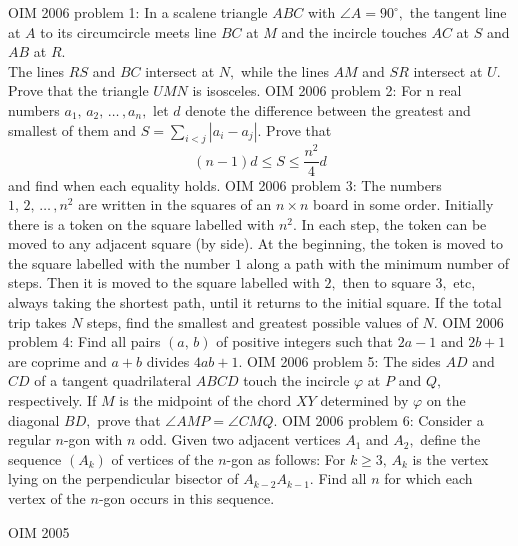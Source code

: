 OIM 2006 problem 1:  In a scalene triangle $ABC$ with $\angle A = 90^\circ,$ the tangent line at $A$ to its circumcircle meets line $BC$ at $M$ and the incircle touches $AC$ at $S$ and $AB$ at $R.$ \\
The lines $RS$ and $BC$ intersect at $N,$ while the lines $AM$ and $SR$ intersect at $U.$ \\
Prove that the triangle $UMN$ is isosceles. 
OIM 2006 problem 2:  For n real numbers $a_1,\, a_2,\, \ldots\, , a_n,$ let $d$ denote the difference between the greatest and smallest of them and $S = \sum_{i<j}\left |a_i-a_j \right|.$ Prove that
\[ (n-1)d\le S\le\frac{n^2}{4}d \]
and find when each equality holds. 
OIM 2006 problem 3:  The numbers $1,\, 2,\, \ldots\, , n^2$ are written in the squares of an $n \times n$ board in some order. Initially there is a token on the square labelled with $n^2.$ In each step, the token can be moved to any adjacent square (by side). At the beginning, the token is moved to the square labelled with the number $1$ along a path with the minimum number of steps. Then it is moved to the square labelled with $2,$ then to square $3,$ etc, always taking the shortest path, until it returns to the initial square. If the total trip takes $N$ steps, find the smallest and greatest possible values of $N.$ 
OIM 2006 problem 4:  Find all pairs $(a,\, b)$ of positive integers such that $2a-1$ and $2b+1$ are coprime and $a+b$ divides $4ab+1.$ 
OIM 2006 problem 5:  The sides $AD$ and $CD$ of a tangent quadrilateral $ABCD$ touch the incircle $\varphi$ at $P$ and $Q,$ respectively. If $M$ is the midpoint of the chord $XY$ determined by $\varphi$ on the diagonal $BD,$ prove that $\angle AMP = \angle CMQ.$ 
OIM 2006 problem 6:  Consider a regular $n$-gon with $n$ odd. Given two adjacent vertices $A_1$ and $A_2,$ define the sequence $(A_k)$ of vertices of the $n$-gon as follows: For $k\ge 3,\, A_k$ is the vertex lying on the perpendicular bisector of $A_{k-2}A_{k-1}.$ Find all $n$ for which each vertex of the $n$-gon occurs in this sequence. 

OIM 2005 

